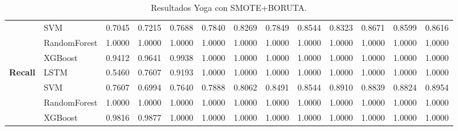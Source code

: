 \begin{table}[h]
\begin{adjustbox}{max width=15cm}
\begin{tabular}{|c|l|r|r|r|r|r|r|r|r|r|r|r|}
			& SVM &  0.7045 &  0.7215 &  0.7688 &  0.7840 &  0.8269 &  0.7849 &  0.8544 &  0.8323 &  0.8671 &  0.8599 &  0.8616 \\
			& RandomForest &  1.0000 &  1.0000 &  1.0000 &  1.0000 &  1.0000 &  1.0000 &  1.0000 &  1.0000 &  1.0000 &  1.0000 &  1.0000 \\
			& XGBoost &  0.9412 &  0.9641 &  0.9938 &  1.0000 &  1.0000 &  1.0000 &  1.0000 &  1.0000 &  1.0000 &  1.0000 &  1.0000 \\
			\hline
			\textbf{Recall} & LSTM &  0.5460 &  0.7607 &  0.9193 &  1.0000 &  1.0000 &  1.0000 &  1.0000 &  1.0000 &  1.0000 &  1.0000 &  1.0000 \\
			& SVM &  0.7607 &  0.6994 &  0.7640 &  0.7888 &  0.8062 &  0.8491 &  0.8544 &  0.8910 &  0.8839 &  0.8824 &  0.8954 \\
			& RandomForest &  1.0000 &  1.0000 &  1.0000 &  1.0000 &  1.0000 &  1.0000 &  1.0000 &  1.0000 &  1.0000 &  1.0000 &  1.0000 \\
			& XGBoost &  0.9816 &  0.9877 &  1.0000 &  1.0000 &  1.0000 &  1.0000 &  1.0000 &  1.0000 &  1.0000 &  1.0000 &  1.0000 \\
			\hline
		\end{tabular}
	\end{adjustbox}
	\caption{Resultados Yoga con SMOTE+BORUTA.}
	\label{tab:Yoga_SMOTE_BORUTA}
\end{table}
